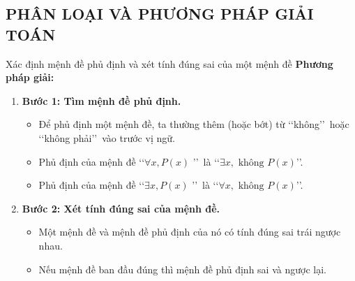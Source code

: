 \subsection{PHÂN LOẠI VÀ PHƯƠNG PHÁP GIẢI TOÁN}
\begin{dang}{Xác định mệnh đề phủ định và xét tính đúng sai của một mệnh đề}
	 \textbf{Phương pháp giải:}
	\begin{enumerate}
		\item \textbf{Bước 1: Tìm mệnh đề phủ định.}
		\begin{itemize}
			\item Để phủ định một mệnh đề, ta thường thêm (hoặc bớt) từ \lq\lq không\rq\rq\ hoặc \lq\lq không phải\rq\rq\ vào trước vị ngữ.
			\item Phủ định của mệnh đề \lq\lq $\forall x, P(x)$ \rq\rq\ là \lq\lq $\exists x, \text{ không } P(x)$\rq\rq.
			\item Phủ định của mệnh đề \lq\lq $\exists x, P(x)$ \rq\rq\ là \lq\lq $\forall x, \text{ không } P(x)$\rq\rq.
		\end{itemize}
		\item \textbf{Bước 2: Xét tính đúng sai của mệnh đề.}
		\begin{itemize}
			\item Một mệnh đề và mệnh đề phủ định của nó có tính đúng sai trái ngược nhau.
			\item Nếu mệnh đề ban đầu đúng thì mệnh đề phủ định sai và ngược lại.
		\end{itemize}
	\end{enumerate}
\end{dang}

